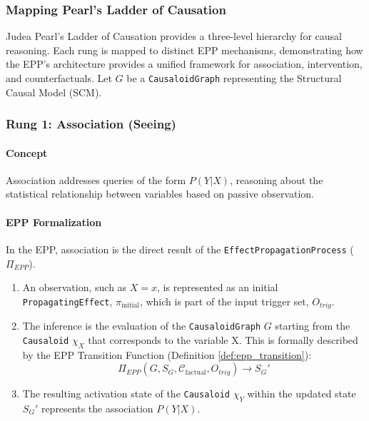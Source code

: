

\subsubsection{Mapping Pearl's Ladder of Causation}
\label{subsec:formalization_mapping_pearl}

Judea Pearl's Ladder of Causation \cite{pearl2000causality} provides a three-level hierarchy for causal reasoning. Each rung is mapped to distinct EPP mechanisms, demonstrating how the EPP's architecture provides a unified framework for association, intervention, and counterfactuals. Let \(G\) be a \texttt{CausaloidGraph} representing the Structural Causal Model (SCM).

\subsubsection*{Rung 1: Association (Seeing)}
\label{sssec:mapping_pearl_rung1}

\paragraph{Concept}
Association addresses queries of the form \(P(Y|X)\), reasoning about the statistical relationship between variables based on passive observation.

\paragraph{EPP Formalization}
In the EPP, association is the direct result of the \texttt{EffectPropagationProcess} (\(\Pi_{EPP}\)).
\begin{enumerate}
    
    \item An observation, such as \(X=x\), is represented as an initial \texttt{PropagatingEffect}, \(\pi_{\text{initial}}\), which is part of the input trigger set, \(O_{trig}\).
    
    \item The inference is the evaluation of the \texttt{CausaloidGraph} \(G\) starting from the \texttt{Causaloid} \(\chi_X\) that corresponds to the variable X. This is formally described by the EPP Transition Function (Definition \ref{def:epp_transition}):
    \[ \Pi_{EPP}(G, S_G, \mathcal{C}_{\text{factual}}, O_{trig}) \to S_G' \]
    \item The resulting activation state of the \texttt{Causaloid} \(\chi_Y\) within the updated state \(S_G'\) represents the association \(P(Y|X)\).
\end{enumerate}

